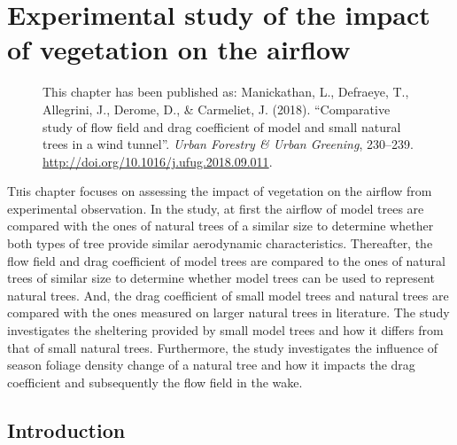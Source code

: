 \chapter{Experimental study of the impact of vegetation on the airflow}
\label{ch:paper2}

\def\figdir{chapters/ch04_experimentalstudymodels/figures}

\begin{figure}[h]
	\centering
	\begin{minipage}{0.9\textwidth}
		\textsf{ \footnotesize This chapter has been published as: Manickathan, L., Defraeye, T., Allegrini, J., Derome, D., \& Carmeliet, J. (2018). ``Comparative study of flow field and drag coefficient of model and small natural trees in a wind tunnel''. \textit{Urban Forestry \& Urban Greening}, 230–239. \url{http://doi.org/10.1016/j.ufug.2018.09.011}.}
	\end{minipage}
\end{figure}
\vspace{2em}

\lettrine[lines=3,nindent=0em,loversize=0.1]{T}{h}is chapter focuses on assessing the impact of vegetation on the airflow from experimental observation. In the study, at first the airflow of model trees are compared with the ones of natural trees of a similar size to determine whether both types of tree provide similar aerodynamic characteristics. Thereafter, the flow field and drag coefficient of model trees are compared to the ones of natural trees of similar size to determine whether model trees can be used to represent natural trees. And, the drag coefficient of small model trees and natural trees are compared with the ones measured on larger natural trees in literature. The study investigates the sheltering provided by small model trees and how it differs from that of small natural trees. Furthermore, the study investigates the influence of season foliage density change of a natural tree and how it impacts the drag coefficient and subsequently the flow field in the wake.

\section{Introduction}

